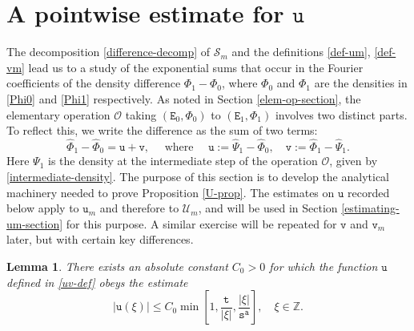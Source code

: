 \documentclass[12pt, twoside]{article}
\newtheorem{lemma}[theorem]{Lemma}
\theoremstyle{definition}
\numberwithin{equation}{section}
\begin{document}
\section{A pointwise estimate for $\mathtt u$} \label{u-pointwise-estimate-section}
The decomposition \eqref{difference-decomp} of $\mathscr{S}_m$ and the definitions \eqref{def-um}, \eqref{def-vm} lead us to a study of
the exponential sums that occur in the Fourier coefficients of the density difference $\Phi_1 - \Phi_0$, where $\Phi_0$ and $\Phi_1$ are the densities in \eqref{Phi0} and \eqref{Phi1} respectively. As noted in Section \ref{elem-op-section}, the elementary operation $\mathscr{O}$ taking $(\mathtt E_0, \Phi_0)$ to $(\mathtt E_1, \Phi_1)$ involves two distinct parts. To reflect this, we write the difference as the sum of two terms: 
\begin{equation}  \widehat{\Phi}_1 - \widehat{\Phi}_0 = \mathtt u + \mathtt v, \quad \text{ where } \quad  \mathtt u := \widehat{\Psi}_1 - \widehat{\Phi}_0, \quad \mathtt v := \widehat{\Phi}_1 - \widehat{\Psi}_1.  \label{uv-def} \end{equation} 
Here $\Psi_1$ is the density at the intermediate step of the operation $\mathscr{O}$, given by \eqref{intermediate-density}. 
\vskip0.1in
\noindent The purpose of this section is to develop the analytical machinery needed to prove Proposition \ref{U-prop}. The estimates on $\mathtt u$ recorded below apply to $\mathtt u_m$ and therefore to $\mathcal U_m$, and will be used in Section \ref{estimating-um-section} for this purpose.  A similar exercise will be repeated for $\mathtt v$ and $\mathtt v_m$ later, but with certain key differences.   
\begin{lemma} \label{u-lemma}
There exists an absolute constant $C_0 > 0$ for which the function $\mathtt u$ defined in \eqref{uv-def} obeys the estimate
\begin{equation} \label{u-pointwise-estimate}
|\mathtt u(\xi)| \leq C_0 \min \left[1, \frac{\mathtt t}{|\xi|}, \frac{|\xi|}{\mathtt s^{\mathtt a}} \right], \quad \xi \in \mathbb Z. 
\end{equation} 
\end{lemma} 
\end{document}
